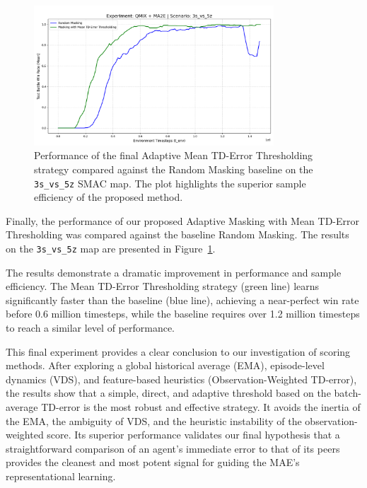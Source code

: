 \begin{figure}[h]
    \centering
    \includegraphics[width=0.8\textwidth]{images_pfe/results_li-ma2e/test_battle_won_mean_3s_vs_5z_Mean_TD-Error_Thresholding _smoothed.png}
    \caption{Performance of the final Adaptive Mean TD-Error Thresholding strategy compared against the Random Masking baseline on the \texttt{3s\_vs\_5z} SMAC map. The plot highlights the superior sample efficiency of the proposed method.}
    \label{fig:mean_td_vs_random}
\end{figure}


Finally, the performance of our proposed Adaptive Masking with Mean TD-Error Thresholding was compared against the baseline Random Masking. The results on the \texttt{3s\_vs\_5z} map are presented in Figure~\ref{fig:mean_td_vs_random}.

The results demonstrate a dramatic improvement in performance and sample efficiency. The Mean TD-Error Thresholding strategy (green line) learns significantly faster than the baseline (blue line), achieving a near-perfect win rate before 0.6 million timesteps, while the baseline requires over 1.2 million timesteps to reach a similar level of performance.

This final experiment provides a clear conclusion to our investigation of scoring methods. After exploring a global historical average (EMA), episode-level dynamics (VDS), and feature-based heuristics (Observation-Weighted TD-error), the results show that a simple, direct, and adaptive threshold based on the batch-average TD-error is the most robust and effective strategy. It avoids the inertia of the EMA, the ambiguity of VDS, and the heuristic instability of the observation-weighted score. Its superior performance validates our final hypothesis that a straightforward comparison of an agent's immediate error to that of its peers provides the cleanest and most potent signal for guiding the MAE's representational learning.

